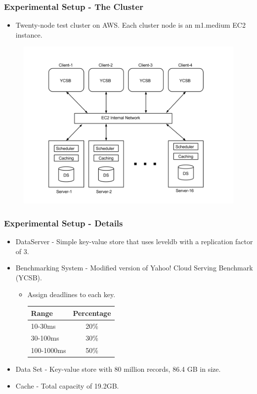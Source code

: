 \documentclass{beamer}
\begin{document}
\begin{frame}
  \frametitle{Experimental Setup - The Cluster}
  \begin{itemize}
  \item Twenty-node test cluster on AWS. Each cluster node is an m1.medium
    EC2 instance.
  \end{itemize}
  \begin{figure}
    \begin{center}
      \centerline{\includegraphics[scale=0.25]{img/Experimental_Setup.png}}
    \end{center}
  \end{figure}
\end{frame}

\begin{frame}
  \frametitle{Experimental Setup - Details}
  \begin{itemize}
  \item DataServer - Simple key-value store that uses leveldb with a
    replication factor of 3.
  \item Benchmarking System - Modified version of Yahoo! Cloud Serving
    Benchmark (YCSB).
    \begin{itemize}
    \item Assign deadlines to each key.\\
      \begin{tabular}{| l | c |}
        \hline
        Range & Percentage \\ \hline
        10-30ms & 20\% \\ \hline
        30-100ms & 30\% \\ \hline
        100-1000ms & 50\% \\ \hline
      \end{tabular}
    \end{itemize}
  \item Data Set - Key-value store with 80 million records, 86.4 GB in size.
  \item Cache - Total capacity of 19.2GB.
  \end{itemize}
\end{frame}
\end{document}
